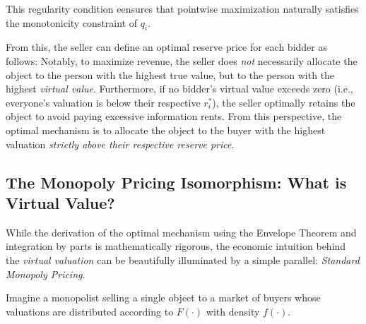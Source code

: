 This regularity condition eensures that pointwise maximization naturally satisfies the monotonicity constraint of $q_i$. 


From this, the seller can define an optimal reserve price for each bidder as follows:
Notably, to maximize revenue, the seller does \textit{not} necessarily allocate the object to the person with the highest true value, but to the person with the highest \textit{virtual value}. Furthermore, if no bidder's virtual value exceeds zero (i.e., everyone's valuation is below their respective $r_i^*$), the seller optimally retains the object to avoid paying excessive information rents. From this perspective, the optimal mechanism is to allocate the object to the buyer with the highest valuation \textit{strictly above their respective reserve price}.

\subsection{The Monopoly Pricing Isomorphism: What is Virtual Value?}

While the derivation of the optimal mechanism using the Envelope Theorem and integration by parts is mathematically rigorous, the economic intuition behind the \textit{virtual valuation} can be beautifully illuminated by a simple parallel: \textit{Standard Monopoly Pricing}.

Imagine a monopolist selling a single object to a market of buyers whose valuations are distributed according to $F(\cdot)$ with density $f(\cdot)$. 

